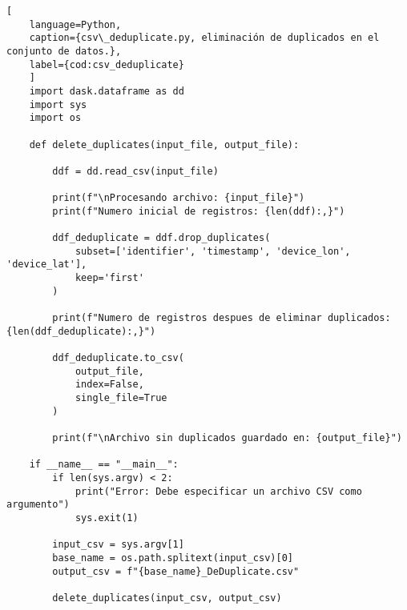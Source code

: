 \begin{lstlisting}[
    language=Python,
    caption={csv\_deduplicate.py, eliminación de duplicados en el conjunto de datos.},
    label={cod:csv_deduplicate}
    ]
    import dask.dataframe as dd
    import sys
    import os

    def delete_duplicates(input_file, output_file):
    
        ddf = dd.read_csv(input_file)
        
        print(f"\nProcesando archivo: {input_file}")
        print(f"Numero inicial de registros: {len(ddf):,}")
        
        ddf_deduplicate = ddf.drop_duplicates(
            subset=['identifier', 'timestamp', 'device_lon', 'device_lat'],
            keep='first'
        )
        
        print(f"Numero de registros despues de eliminar duplicados: {len(ddf_deduplicate):,}")
        
        ddf_deduplicate.to_csv(
            output_file,
            index=False,
            single_file=True
        )
        
        print(f"\nArchivo sin duplicados guardado en: {output_file}")

    if __name__ == "__main__":
        if len(sys.argv) < 2:
            print("Error: Debe especificar un archivo CSV como argumento")
            sys.exit(1)

        input_csv = sys.argv[1]
        base_name = os.path.splitext(input_csv)[0]
        output_csv = f"{base_name}_DeDuplicate.csv" 
        
        delete_duplicates(input_csv, output_csv)
\end{lstlisting}
\vfill

